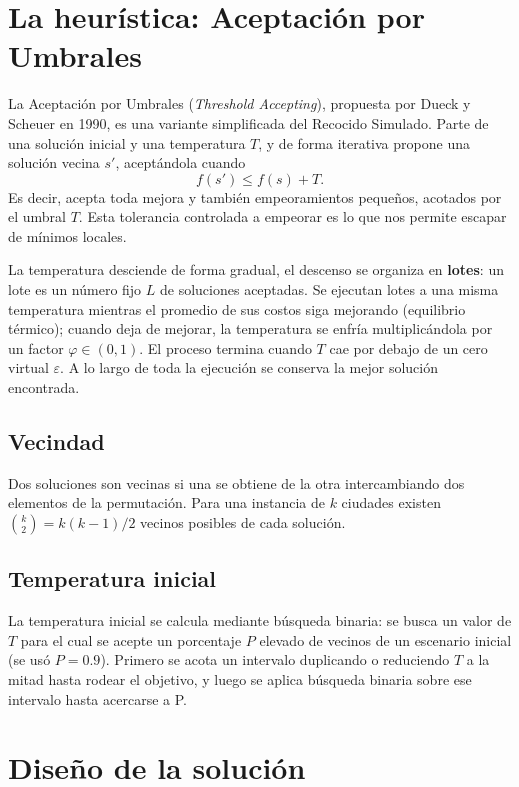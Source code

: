 \documentclass[letterpaper,12pt]{article} %
\begin{document}
\section{La heurística: Aceptación por Umbrales}

La Aceptación por Umbrales (\textit{Threshold Accepting}), propuesta por Dueck y
Scheuer en 1990, es una variante simplificada del Recocido Simulado. Parte de
una solución inicial y una temperatura $T$, y de forma iterativa propone una
solución vecina $s'$, aceptándola cuando
\[
    f(s') \leq f(s) + T.
\]
Es decir, acepta toda mejora y también empeoramientos pequeños, acotados por el
umbral $T$. Esta tolerancia controlada a empeorar es lo que nos permite escapar de
mínimos locales.

La temperatura desciende de forma gradual, el descenso se organiza en
\textbf{lotes}: un lote es un número fijo $L$ de soluciones aceptadas. Se
ejecutan lotes a una misma temperatura mientras el promedio de sus costos siga
mejorando (equilibrio térmico); cuando deja de mejorar, la temperatura se enfría
multiplicándola por un factor $\varphi \in (0,1)$. El proceso termina cuando
$T$ cae por debajo de un cero virtual $\varepsilon$. A lo largo de toda la
ejecución se conserva la mejor solución encontrada.

\subsection{Vecindad}

Dos soluciones son vecinas si una se obtiene de la otra intercambiando dos
elementos de la permutación. Para una instancia de $k$ ciudades existen
$\binom{k}{2} = k(k-1)/2$ vecinos posibles de cada solución.

\subsection{Temperatura inicial}

La temperatura inicial se calcula mediante búsqueda binaria: se busca un valor de
$T$ para el cual se acepte un porcentaje $P$ elevado de vecinos de un escenario
inicial (se usó $P = 0.9$). Primero se acota un intervalo duplicando o
reduciendo $T$ a la mitad hasta rodear el objetivo, y luego se aplica búsqueda binaria sobre ese intervalo hasta acercarse a 
P.

\section{Diseño de la solución}
\end{document}

